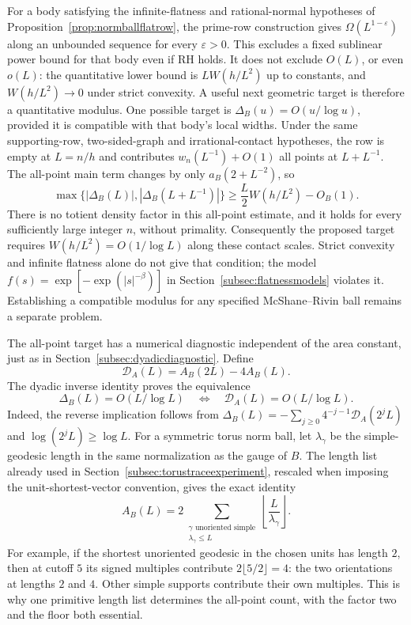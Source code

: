 For a body satisfying the infinite-flatness and rational-normal hypotheses
of Proposition~\ref{prop:normballflatrow}, the prime-row construction gives
$\Omega(L^{1-\varepsilon})$ along an unbounded sequence for every
$\varepsilon>0$. This excludes a fixed sublinear power bound for that
body even if RH holds. It does not exclude $O(L)$, or even $o(L)$:
the quantitative lower bound is $L W(h/L^2)$ up to constants, and
$W(h/L^2)\to0$ under strict convexity. A useful next geometric target is therefore a quantitative modulus.
One possible target is $\Delta_B(u)=O(u/\log u)$, provided it is
compatible with that body's local widths. Under the same supporting-row,
two-sided-graph and irrational-contact hypotheses, the row is empty at
$L=n/h$ and contributes $w_n(L^{-1})+O(1)$ all points at $L+L^{-1}$.
The all-point main term changes by only $a_B(2+L^{-2})$, so
\[
 \max\{|\Delta_B(L)|,|\Delta_B(L+L^{-1})|\}
 \ge \frac L2W(h/L^2)-O_B(1).
\]
There is no totient density factor in this all-point estimate, and it
holds for every sufficiently large integer $n$, without primality.
Consequently the proposed target requires $W(h/L^2)=O(1/\log L)$
along these contact scales. Strict
convexity and infinite flatness alone do not give that condition;
the model $f(s)=\exp[-\exp(|s|^{-\beta})]$ in
Section~\ref{subsec:flatnessmodels} violates it. Establishing a compatible
modulus for any specified McShane--Rivin ball remains a separate problem.

The all-point target has a numerical diagnostic independent of the area
constant, just as in Section~\ref{subsec:dyadicdiagnostic}. Define
\[
 \mathcal D_A(L)=A_B(2L)-4A_B(L).
\]
The dyadic inverse identity proves the equivalence
\begin{equation}
 \Delta_B(L)=O(L/\log L)
 \quad\Longleftrightarrow\quad
 \mathcal D_A(L)=O(L/\log L).
 \label{eq:allPointLogDiagnostic}
\end{equation}
Indeed, the reverse implication follows from
$\Delta_B(L)=-\sum_{j\ge0}4^{-j-1}\mathcal D_A(2^jL)$
and $\log(2^jL)\ge\log L$. For a symmetric torus norm ball,
let $\lambda_\gamma$ be the simple-geodesic length in the same
normalization as the gauge of $B$. The length list already used in
Section~\ref{subsec:torustraceexperiment}, rescaled when imposing the
unit-shortest-vector convention, gives the exact identity
\[
 A_B(L)=2\sum_{\substack{\gamma\text{ unoriented simple}\\\lambda_\gamma\le L}}
               \left\lfloor\frac L{\lambda_\gamma}\right\rfloor.
\]
For example, if the shortest unoriented geodesic in the chosen
units has length $2$, then at cutoff $5$ its signed multiples
contribute $2\lfloor5/2\rfloor=4$: the two orientations at
lengths $2$ and $4$. Other simple supports contribute their own
multiples. This is why one primitive length list determines the
all-point count, with the factor two and the floor both essential.

